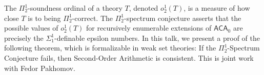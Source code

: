 \documentclass[bsl,meeting]{asl}
\newcommand{\NP}{}
\begin{document}
\thispagestyle{empty}


\NP  
{}


The $\Pi^1_2$-soundness ordinal of a theory $T$, denoted $o^1_2(T)$, is a measure of how close $T$ is to being $\Pi^1_2$-correct. The $\Pi^1_2$-spectrum conjecture 
asserts that the possible values of $o^1_2(T)$ for recursively enumerable extensions of $\mathsf{ACA}_0$ are precisely the $\Sigma^1_1$-definable epsilon 
numbers. In this talk, we present a proof of the following theorem, which is formalizable in weak set theories: If the $\Pi^1_2$-Spectrum Conjecture 
fails, then Second-Order Arithmetic is consistent. This is joint work with Fedor Pakhomov.





\end{document}
